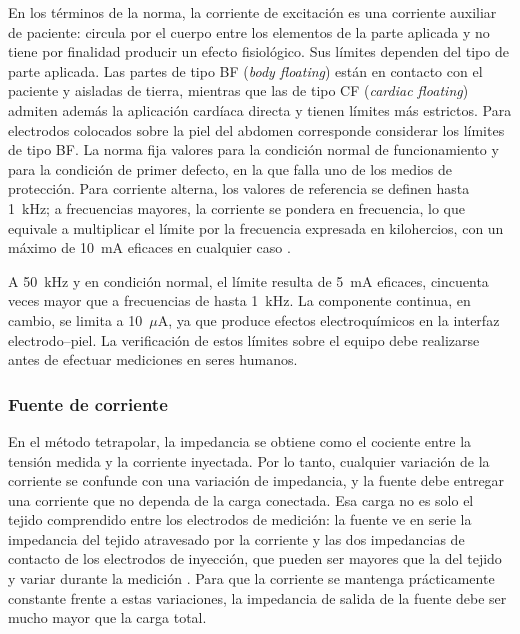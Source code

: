 \documentclass[12pt,a4paper]{article}
\begin{document}
En los términos de la norma, la corriente de excitación es una corriente auxiliar de paciente: circula
por el cuerpo entre los elementos de la parte aplicada y no tiene por finalidad producir un efecto
fisiológico. Sus límites dependen del tipo de parte aplicada. Las partes de tipo BF (\textit{body
floating}) están en contacto con el paciente y aisladas de tierra, mientras que las de tipo CF
(\textit{cardiac floating}) admiten además la aplicación cardíaca directa y tienen límites más
estrictos. Para electrodos colocados sobre la piel del abdomen corresponde considerar los límites de
tipo BF. La norma fija valores para la condición normal de funcionamiento y para la condición de
primer defecto, en la que falla uno de los medios de protección. Para corriente alterna, los valores
de referencia se definen hasta 1~kHz; a frecuencias mayores, la corriente se pondera en frecuencia,
lo que equivale a multiplicar el límite por la frecuencia expresada en kilohercios, con un máximo de
10~mA eficaces en cualquier caso \cite{iec60601}.


A 50~kHz y en condición normal, el límite resulta de 5~mA eficaces, cincuenta veces mayor que a
frecuencias de hasta 1~kHz. La componente continua, en cambio, se limita a 10~$\mu$A, ya que produce
efectos electroquímicos en la interfaz electrodo--piel. La verificación
de estos límites sobre el equipo debe realizarse antes de efectuar mediciones en seres humanos.

\subsubsection{Fuente de corriente}

En el método tetrapolar, la impedancia se obtiene como el cociente entre la tensión medida y la
corriente inyectada. Por lo tanto, cualquier variación de la corriente se confunde con una variación
de impedancia, y la fuente debe entregar una corriente que no dependa de la carga conectada. Esa
carga no es solo el tejido comprendido entre los electrodos de medición: la fuente ve en serie la
impedancia del tejido atravesado por la corriente y las dos impedancias de contacto de los electrodos
de inyección, que pueden ser mayores que la del tejido y variar durante la medición
\cite{grimnes2015bioimpedance}. Para que la corriente se mantenga prácticamente constante frente a
estas variaciones, la impedancia de salida de la fuente debe ser mucho mayor que la carga total.
\end{document}
